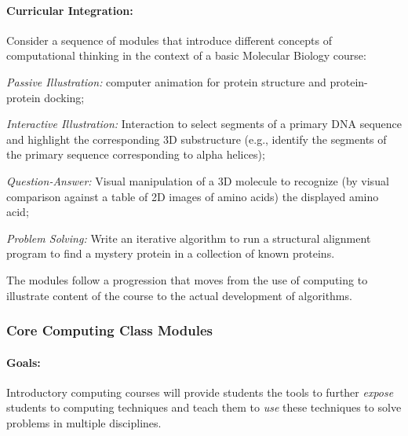 
\paragraph{Curricular Integration:}
Consider a sequence of modules that  introduce different concepts of computational thinking in the context of a basic Molecular Biology course:
\begin{tightenumerate}
\item \emph{Passive Illustration:} computer animation  for protein structure and protein-protein docking; 
\item \emph{Interactive Illustration:} Interaction to select segments of a primary DNA sequence and highlight the corresponding 3D substructure (e.g., identify the segments of the primary sequence corresponding to alpha helices);
\item \emph{Question-Answer:} Visual manipulation of a 3D molecule to recognize (by visual comparison against a table of 2D images of amino acids) the displayed amino acid;
\item \emph{Problem Solving:} Write an iterative algorithm to run a structural alignment program to find a mystery protein in a collection of known proteins.
\end{tightenumerate}
The modules follow a  progression that moves from the use of computing to illustrate content of the course to the actual development of algorithms.

\subsubsection{Core Computing Class Modules}
\paragraph{Goals:} Introductory computing courses will provide  students the tools to further \emph{expose} students to computing techniques and teach them to \emph{use} these techniques to solve problems in multiple disciplines.

